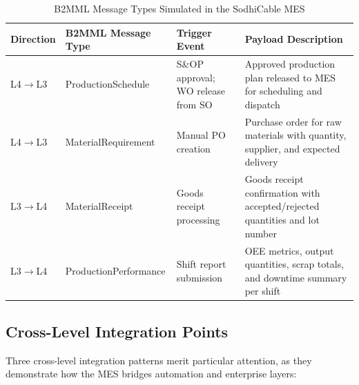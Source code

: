 \begin{table}[H]\centering\small
\caption{B2MML Message Types Simulated in the SodhiCable MES}
\label{tab:b2mml}
\begin{tabularx}{\textwidth}{@{} l l l L{5.0cm} @{}}
\toprule
\textbf{Direction} & \textbf{B2MML Message Type} & \textbf{Trigger Event} & \textbf{Payload Description} \\
\midrule
L4$\to$L3 & ProductionSchedule & S\&OP approval; WO release from SO & Approved production plan released to MES for scheduling and dispatch \\
L4$\to$L3 & MaterialRequirement & Manual PO creation & Purchase order for raw materials with quantity, supplier, and expected delivery \\
L3$\to$L4 & MaterialReceipt & Goods receipt processing & Goods receipt confirmation with accepted/rejected quantities and lot number \\
L3$\to$L4 & ProductionPerformance & Shift report submission & OEE metrics, output quantities, scrap totals, and downtime summary per shift \\
\bottomrule
\end{tabularx}
\end{table}


\subsection{Cross-Level Integration Points}

Three cross-level integration patterns merit particular attention, as they
demonstrate how the MES bridges automation and enterprise layers:


